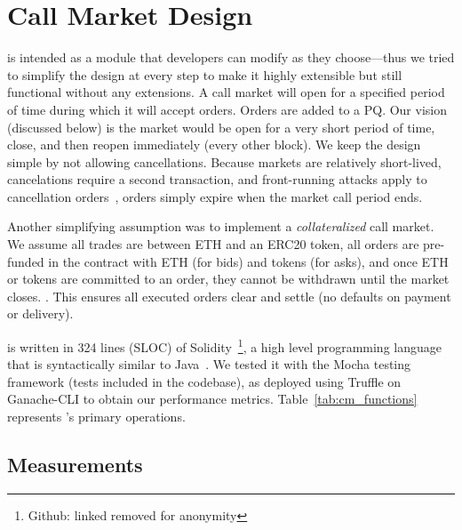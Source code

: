 
\section{Call Market Design}




\cm is intended as a module that developers can modify as they choose---thus we tried to simplify the design at every step to make it highly extensible but still functional without any extensions. A call market will open for a specified period of time during which it will accept orders. Orders are added to a PQ. Our vision (discussed below) is the market would be open for a very short period of time, close, and then reopen immediately (\eg every other block). We keep the design simple by not allowing cancellations. Because markets are relatively short-lived, cancelations require a second transaction, and front-running attacks apply to cancellation orders~\cite{eskandari2019sok}, orders simply expire when the market call period ends. 

Another simplifying assumption was to implement a \textit{collateralized} call market. We assume all trades are between ETH and an ERC20 token, all orders are pre-funded in the contract with ETH (for bids) and tokens (for asks), and once ETH or tokens are committed to an order, they cannot be withdrawn until the market closes. . This ensures all executed orders clear and settle (\ie no defaults on payment or delivery).


\cm is written in 324 lines (SLOC) of Solidity~\footnote{Github: linked removed for anonymity}, a high level programming language that is syntactically similar to Java~\cite{Ethereum41:online}. We tested it with the Mocha testing framework (tests included in the codebase), as deployed using Truffle on Ganache-CLI to obtain our performance metrics. Table~\ref{tab:cm_functions} represents \cm's primary operations.


 \subsection{Measurements}
 
